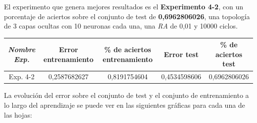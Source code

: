 \documentclass{uc3mpracticas}
\begin{document}
El experimento que genera mejores resultados es el \textbf{Experimento 4-2}, con un porcentaje de aciertos sobre el conjunto de test de \textbf{0,6962806026}, una topología de 3 capas ocultas con 10 neuronas cada una, una \textit{RA} de 0,01 y 10000 ciclos.

\begin{center}
  \begin{tabular}{|c|c|c|c|c|}
    \hline
        \textit{\textbf{Nombre Exp.}}     & \textbf{Error entrenamiento} & \textbf{\% de aciertos entrenamiento} & \textbf{Error test} & \textbf{\% de aciertos test}\\ \hline
        Exp. 4-2         &  0,2587682627       &  0,8191754604                &  0,4534598606   &  0,6962806026     \\ \hline
  \end{tabular}
\end{center}

La evolución del error sobre el conjunto de test y el conjunto de entrenamiento a lo largo del aprendizaje se puede ver en las siguientes gráficas para cada una de las hojas:
\end{document}
